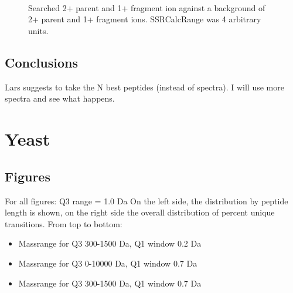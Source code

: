 \begin{figure}
\\
\\
\\

\label{label4}
\caption{
Searched 2+ parent and 1+ fragment ion against a background of 2+ parent and 1+ fragment ions.
SSRCalcRange was 4 arbitrary units.
}
\end{figure}


\subsection{Conclusions}
Lars suggests to take the N best peptides (instead of spectra). I will use
more spectra and see what happens.




\section{Yeast}

\subsection{Figures}


For all figures:
Q3 range = 1.0 Da
On the left side, the distribution by peptide length is shown, on the right side the overall distribution of percent unique transitions.
From top to bottom: 
\begin{itemize}
\item Massrange for Q3 300-1500 Da, Q1 window 0.2 Da
\item Massrange for Q3 0-10000  Da, Q1 window 0.7 Da
\item Massrange for Q3 300-1500 Da, Q1 window 0.7 Da
\end{itemize}



